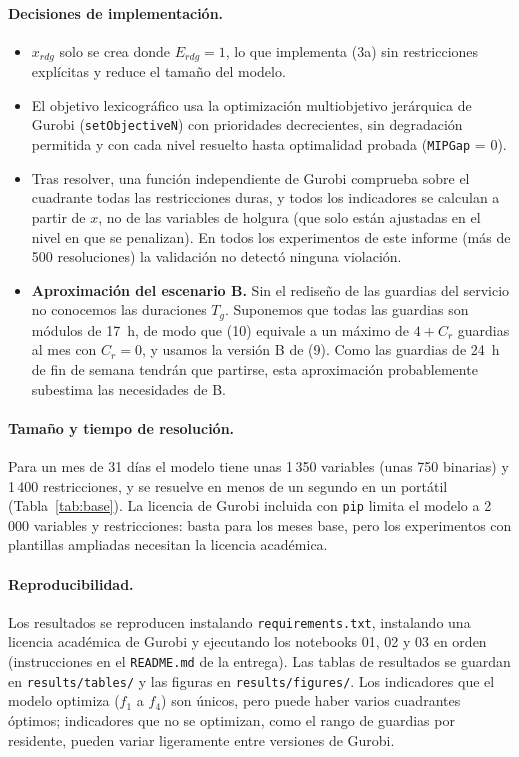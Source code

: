 \paragraph{Decisiones de implementación.}
\begin{itemize}
  \item $x_{rdg}$ solo se crea donde $E_{rdg} = 1$, lo que implementa (3a) sin restricciones explícitas y reduce el tamaño del modelo.
  \item El objetivo lexicográfico usa la optimización multiobjetivo jerárquica de Gurobi (\texttt{setObjectiveN}) con prioridades decrecientes, sin degradación permitida y con cada nivel resuelto hasta optimalidad probada (\texttt{MIPGap} = 0).
  \item Tras resolver, una función independiente de Gurobi comprueba sobre el cuadrante todas las restricciones duras, y todos los indicadores se calculan a partir de $x$, no de las variables de holgura (que solo están ajustadas en el nivel en que se penalizan). En todos los experimentos de este informe (más de 500 resoluciones) la validación no detectó ninguna violación.
  \item \textbf{Aproximación del escenario B.} Sin el rediseño de las guardias del servicio no conocemos las duraciones $T_g$. Suponemos que todas las guardias son módulos de 17~h, de modo que (10) equivale a un máximo de $4 + C_r$ guardias al mes con $C_r = 0$, y usamos la versión B de (9). Como las guardias de 24~h de fin de semana tendrán que partirse, esta aproximación probablemente subestima las necesidades de B.
\end{itemize}

\paragraph{Tamaño y tiempo de resolución.} Para un mes de 31 días el modelo tiene unas 1\,350 variables (unas 750 binarias) y 1\,400 restricciones, y se resuelve en menos de un segundo en un portátil (Tabla~\ref{tab:base}). La licencia de Gurobi incluida con \texttt{pip} limita el modelo a 2\,000 variables y restricciones: basta para los meses base, pero los experimentos con plantillas ampliadas necesitan la licencia académica.

\paragraph{Reproducibilidad.} Los resultados se reproducen instalando \texttt{requirements.txt}, instalando una licencia académica de Gurobi y ejecutando los notebooks 01, 02 y 03 en orden (instrucciones en el \texttt{README.md} de la entrega). Las tablas de resultados se guardan en \texttt{results/tables/} y las figuras en \texttt{results/figures/}. Los indicadores que el modelo optimiza ($f_1$ a $f_4$) son únicos, pero puede haber varios cuadrantes óptimos; indicadores que no se optimizan, como el rango de guardias por residente, pueden variar ligeramente entre versiones de Gurobi.
